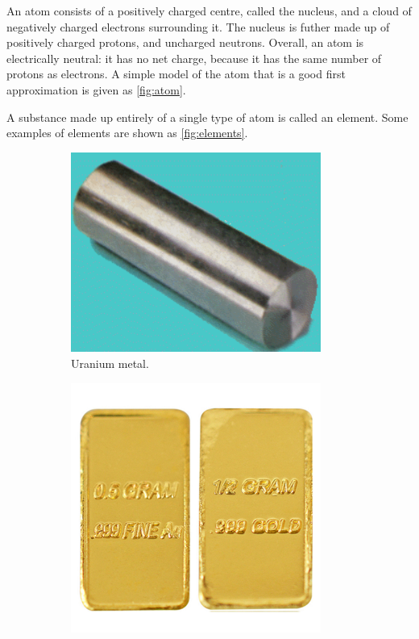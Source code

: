 \documentclass[a4paper]{memoir}
\begin{document}
An atom consists of a positively charged centre, called the nucleus, and a cloud of negatively charged electrons surrounding it. The nucleus is
futher made up of positively charged protons, and uncharged neutrons. Overall, an atom is electrically neutral: it has no net charge, because it
has the same number of protons as electrons. A simple model of the atom that is a good first approximation is given as \cref{fig:atom}.

A substance made up entirely of a single type of atom is called an element. Some examples of elements are shown as \cref{fig:elements}.

\begin{figure}
  \centering
  \begin{subfigure}[t]{0.45\textwidth}
    \centering
    \includegraphics[width=0.9\textwidth]{uranium}
    \caption{Uranium metal.}
  \end{subfigure}%
  \begin{subfigure}[t]{0.45\textwidth}
    \centering
    \includegraphics[width=0.9\textwidth]{gold}

\end{subfigure}
\end{figure}
\end{document}
